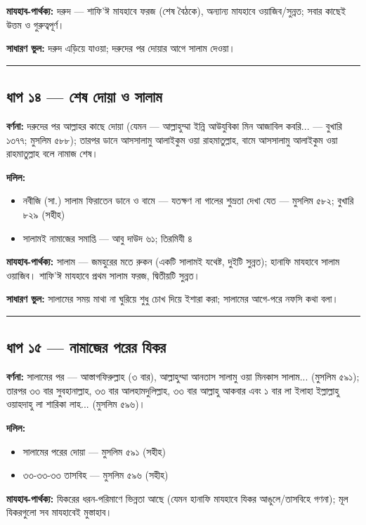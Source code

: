 \textbf{মাযহাব-পার্থক্য:} দরুদ — শাফি'ঈ মাযহাবে ফরজ (শেষ বৈঠকে), অন্যান্য মাযহাবে ওয়াজিব/সুন্নত; সবার কাছেই উত্তম ও গুরুত্বপূর্ণ।

\textbf{সাধারণ ভুল:} দরুদ এড়িয়ে যাওয়া; দরুদের পর দোয়ার আগে সালাম দেওয়া।

\medskip\hrule\medskip

\subsection*{ধাপ ১৪ — শেষ দোয়া ও সালাম}

\textbf{বর্ণনা:} দরুদের পর আল্লাহর কাছে দোয়া (যেমন — আল্লাহুম্মা ইন্নি আউযুবিকা মিন আজাবিল কবরি... — বুখারি ১৩৭৭; মুসলিম ৫৮৮); তারপর ডানে আসসালামু আলাইকুম ওয়া রাহমাতুল্লাহ, বামে আসসালামু আলাইকুম ওয়া রাহমাতুল্লাহ বলে নামাজ শেষ।

\textbf{দলিল:}
\begin{itemize}
\item {}নবীজি (সা.) সালাম ফিরাতেন ডানে ও বামে — যতক্ষণ না গালের শুভ্রতা দেখা যেত — মুসলিম ৫৮২; বুখারি ৮২৯ (সহীহ)
\item সালামই নামাজের সমাপ্তি — আবু দাউদ ৬১; তিরমিযী ৪
\end{itemize}
\textbf{মাযহাব-পার্থক্য:} সালাম — জমহুরের মতে রুকন (একটি সালামই যথেষ্ট, দুইটি সুন্নত); হানাফি মাযহাবে সালাম ওয়াজিব। শাফি'ঈ মাযহাবে প্রথম সালাম ফরজ, দ্বিতীয়টি সুন্নত।

\textbf{সাধারণ ভুল:} সালামের সময় মাথা না ঘুরিয়ে শুধু চোখ দিয়ে ইশারা করা; সালামের আগে-পরে নফসি কথা বলা।

\medskip\hrule\medskip

\subsection*{ধাপ ১৫ — নামাজের পরের যিকর}

\textbf{বর্ণনা:} সালামের পর — আস্তাগফিরুল্লাহ (৩ বার), আল্লাহুম্মা আনতাস সালামু ওয়া মিনকাস সালাম... (মুসলিম ৫৯১); তারপর ৩৩ বার সুবহানাল্লাহ, ৩৩ বার আলহামদুলিল্লাহ, ৩৩ বার আল্লাহু আকবার এবং ১ বার লা ইলাহা ইল্লাল্লাহু ওয়াহদাহু লা শারিকা লাহ... (মুসলিম ৫৯৬)।

\textbf{দলিল:}
\begin{itemize}
\item সালামের পরের দোয়া — মুসলিম ৫৯১ (সহীহ)
\item ৩৩-৩৩-৩৩ তাসবিহ — মুসলিম ৫৯৬ (সহীহ)
\end{itemize}
\textbf{মাযহাব-পার্থক্য:} যিকরের ধরন-পরিমাণে ভিন্নতা আছে (যেমন হানাফি মাযহাবে যিকর আঙুলে/তাসবিহে গণনা); মূল যিকরগুলো সব মাযহাবেই মুস্তাহাব।

